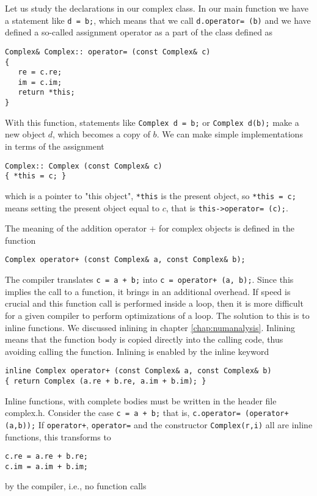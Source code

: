 Let us study the declarations in our complex class.
In our main function we have a statement like \verb?d = b;?, which means
that we call \verb?d.operator= (b)? and we have defined a so-called assignment operator
as a part of the class defined as
\begin{lstlisting}
Complex& Complex:: operator= (const Complex& c)
{
   re = c.re;
   im = c.im;
   return *this;
}
\end{lstlisting}
With this function, statements like
\verb?Complex d = b;? or \verb?Complex d(b);?
make a new object $d$, which becomes a copy of $b$. 
We can make simple implementations in terms of the assignment
\begin{lstlisting}
Complex:: Complex (const Complex& c)
{ *this = c; }
\end{lstlisting}
which  is a pointer to "this object", \verb?*this? is the present object,
so \verb?*this = c;? means setting the present object equal to $c$, that is
\verb?this->operator= (c);?.



The meaning of the addition operator $+$ for complex objects is defined in the
function
\begin{lstlisting}
Complex operator+ (const Complex& a, const Complex& b); 
\end{lstlisting}
The compiler translates \verb?c = a + b;? into \verb?c = operator+ (a, b);?. 
Since this implies the call to a function, it brings in an additional overhead. If speed
is crucial and this function call is performed inside a loop, then it is more difficult for a 
given compiler to perform optimizations of a loop.
The solution to this is to inline functions.   We discussed inlining in chapter \ref{chap:numanalysis}.
Inlining means that the function body is copied directly into
the calling code, thus avoiding calling the function.
Inlining is enabled by the inline keyword
\begin{lstlisting}
inline Complex operator+ (const Complex& a, const Complex& b)
{ return Complex (a.re + b.re, a.im + b.im); }
\end{lstlisting}
Inline functions, with complete bodies must be written in the header file  complex.h.
Consider  the case \verb?c = a + b;?
that is,  \verb?c.operator= (operator+ (a,b));?
If \verb?operator+?, \verb?operator=? and the constructor \verb?Complex(r,i)? all
are inline functions, this transforms to
\begin{lstlisting}
c.re = a.re + b.re;
c.im = a.im + b.im;
\end{lstlisting}
by the compiler, i.e., no function calls

